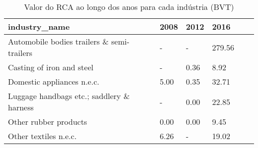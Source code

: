\begin{table}
\centering
\caption{Valor do RCA ao longo dos anos para cada indústria (BVT)}
\begin{tabular}{p{6cm}p{1.5cm}p{1.5cm}p{1.5cm}p{1.5cm}p{1.5cm}}
\toprule
                             industry\_name & 2008 & 2012 &   2016 \\
\midrule
Automobile bodies trailers \& semi-trailers &    - &    - & 279.56 \\
                 Casting of iron and steel &    - & 0.36 &   8.92 \\
                Domestic appliances n.e.c. & 5.00 & 0.35 &  32.71 \\
 Luggage handbags etc.; saddlery \& harness &    - & 0.00 &  22.85 \\
                     Other rubber products & 0.00 & 0.00 &   9.45 \\
                     Other textiles n.e.c. & 6.26 &    - &  19.02 \\
\bottomrule
\end{tabular}
\end{table}
